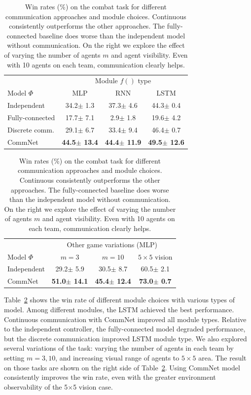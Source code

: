 \documentclass{article}
\newcommand{\tab}[1]{Table~\ref{tab:#1}}
\newcommand{\res}[2]{#1{\scriptsize $\pm$ #2} }
\begin{document}
\begin{table}[h]
\center
\footnotesize
\setlength{\tabcolsep}{3pt}
\begin{tabular}{|l|c|c|c|} \hline
              & \multicolumn{3}{|c|}{Module $f()$ type} \\ 
Model $\Phi$             & MLP & RNN & LSTM \\ \hline
Independent               & \res{34.2}{1.3} & \res{37.3}{4.6} & \res{44.3}{0.4}  \\ \hline
Fully-connected          & \res{17.7}{7.1} & \res{2.9}{1.8} & \res{19.6}{4.2}  \\ \hline
Discrete comm.           & \res{29.1}{6.7} & \res{33.4}{9.4} & \res{46.4}{0.7} \\ \hline \hline
CommNet         & \textbf{\res{44.5}{13.4}} & \textbf{\res{44.4}{11.9}} & \textbf{\res{49.5}{12.6}} \\ \hline
\end{tabular}
\:
\begin{tabular}{|l|c|c|c|} \hline
              & \multicolumn{3}{|c|}{Other game variations (MLP)} \\ %
Model $\Phi$             & $m=3$ & $m=10$ & $5\times 5$ vision \\ \hline
Independent               &\res{29.2}{5.9} & \res{30.5}{8.7} & \res{60.5}{2.1} \\ \hline
CommNet         & \textbf{\res{51.0}{14.1}} & \textbf{\res{45.4}{12.4}} & \textbf{\res{73.0}{0.7}} \\ \hline
\end{tabular}


\caption{Win rates (\%) on the combat task for different communication
approaches and module choices. Continuous consistently outperforms the
other approaches. The fully-connected baseline does worse than the independent model without 
communication. On the right we explore the effect of varying
the number of agents $m$ and agent visibility. Even with 10 agents on
each team, communication clearly helps.}
\label{tab:combat}
\end{table}


\tab{combat} shows the win rate of different module choices with various types of
model. Among different modules, the LSTM achieved the best
performance. Continuous communication with CommNet improved all module
types. Relative to the independent controller, the fully-connected model degraded performance,
but the discrete communication improved LSTM module type.
We also explored several variations of the task: varying the number of
agents in each team by setting $m=3,10$, and increasing visual range
of agents to $5\times 5$ area. The result on those tasks are shown on
the right side of \tab{combat}. Using CommNet model consistently 
improves the win rate, even with the
greater environment observability of the 5$\times$5 vision case.
\end{document}
